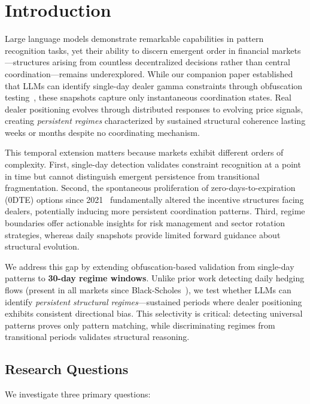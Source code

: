 \section{Introduction}

Large language models demonstrate remarkable capabilities in pattern recognition tasks, yet their ability to discern emergent order in financial markets—structures arising from countless decentralized decisions rather than central coordination—remains underexplored. While our companion paper established that LLMs can identify single-day dealer gamma constraints through obfuscation testing~\cite{regan2025obfuscation}, these snapshots capture only instantaneous coordination states. Real dealer positioning evolves through distributed responses to evolving price signals, creating \textit{persistent regimes} characterized by sustained structural coherence lasting weeks or months despite no coordinating mechanism.

This temporal extension matters because markets exhibit different orders of complexity. First, single-day detection validates constraint recognition at a point in time but cannot distinguish emergent persistence from transitional fragmentation. Second, the spontaneous proliferation of zero-days-to-expiration (0DTE) options since 2021~\cite{cboe2024zero,dim2025zero} fundamentally altered the incentive structures facing dealers, potentially inducing more persistent coordination patterns. Third, regime boundaries offer actionable insights for risk management and sector rotation strategies, whereas daily snapshots provide limited forward guidance about structural evolution.

We address this gap by extending obfuscation-based validation from single-day patterns to \textbf{30-day regime windows}. Unlike prior work detecting daily hedging flows (present in all markets since Black-Scholes~\cite{black1973pricing}), we test whether LLMs can identify \textit{persistent structural regimes}—sustained periods where dealer positioning exhibits consistent directional bias. This selectivity is critical: detecting universal patterns proves only pattern matching, while discriminating regimes from transitional periods validates structural reasoning.

\subsection{Research Questions}

We investigate three primary questions:

